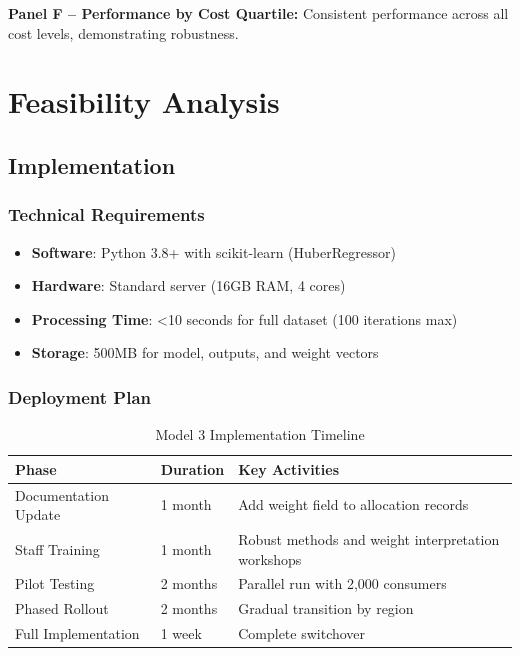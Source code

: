 \textbf{Panel F -- Performance by Cost Quartile:}
Consistent performance across all cost levels, demonstrating robustness.

\section{Feasibility Analysis}

\subsection{Implementation}

\subsubsection{Technical Requirements}
\begin{itemize}
    \item \textbf{Software}: Python 3.8+ with scikit-learn (HuberRegressor)
    \item \textbf{Hardware}: Standard server (16GB RAM, 4 cores)
    \item \textbf{Processing Time}: <10 seconds for full dataset (100 iterations max)
    \item \textbf{Storage}: 500MB for model, outputs, and weight vectors
\end{itemize}

\subsubsection{Deployment Plan}

\begin{table}[h]
\centering
\caption{Model 3 Implementation Timeline}
\begin{tabular}{llp{8cm}}
\toprule
\textbf{Phase} & \textbf{Duration} & \textbf{Key Activities} \\
\midrule
Documentation Update & 1 month & Add weight field to allocation records \\
Staff Training & 1 month & Robust methods and weight interpretation workshops \\
Pilot Testing & 2 months & Parallel run with 2,000 consumers \\
Phased Rollout & 2 months & Gradual transition by region \\
Full Implementation & 1 week & Complete switchover \\
\bottomrule
\end{tabular}
\end{table}

